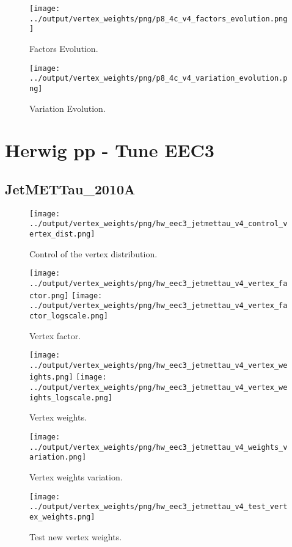 \documentclass[11pt]{book}
\begin{document}
\begin{figure}[ht]
\centering
\texttt{[image: ../output/vertex\_weights/png/p8\_4c\_v4\_factors\_evolution.png]}
\caption{Factors Evolution.}
\end{figure}

\begin{figure}[ht]
\centering
\texttt{[image: ../output/vertex\_weights/png/p8\_4c\_v4\_variation\_evolution.png]}
\caption{Variation Evolution.}
\end{figure}
\clearpage


\section{Herwig pp - Tune EEC3}
\subsection{JetMETTau\_2010A}
\begin{figure}[ht]
\centering
\texttt{[image: ../output/vertex\_weights/png/hw\_eec3\_jetmettau\_v4\_control\_vertex\_dist.png]}
\caption{Control of the vertex distribution.}
\end{figure}

\begin{figure}[ht]
\centering
\texttt{[image: ../output/vertex\_weights/png/hw\_eec3\_jetmettau\_v4\_vertex\_factor.png]}
\texttt{[image: ../output/vertex\_weights/png/hw\_eec3\_jetmettau\_v4\_vertex\_factor\_logscale.png]}
\caption{Vertex factor.}
\end{figure}

\begin{figure}[ht]
\centering
\texttt{[image: ../output/vertex\_weights/png/hw\_eec3\_jetmettau\_v4\_vertex\_weights.png]}
\texttt{[image: ../output/vertex\_weights/png/hw\_eec3\_jetmettau\_v4\_vertex\_weights\_logscale.png]}
\caption{Vertex weights.}
\end{figure}

\begin{figure}[ht]
\centering
\texttt{[image: ../output/vertex\_weights/png/hw\_eec3\_jetmettau\_v4\_weights\_variation.png]}
\caption{Vertex weights variation.}
\end{figure}

\begin{figure}[ht]
\centering
\texttt{[image: ../output/vertex\_weights/png/hw\_eec3\_jetmettau\_v4\_test\_vertex\_weights.png]}
\caption{Test new vertex weights.}
\end{figure}
\clearpage
\end{document}
